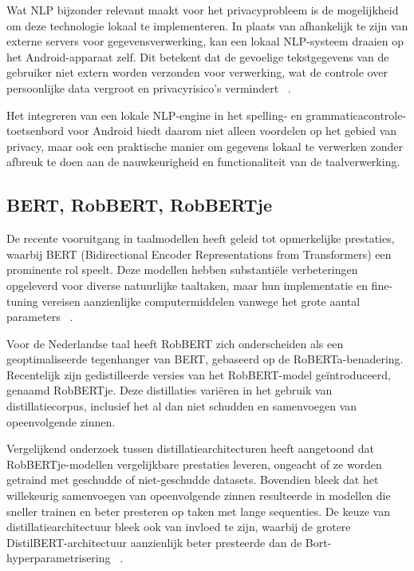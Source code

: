 Wat NLP bijzonder relevant maakt voor het privacyprobleem is de mogelijkheid om deze technologie lokaal te implementeren. In plaats van afhankelijk te zijn van externe servers voor gegevensverwerking, kan een lokaal NLP-systeem draaien op het Android-apparaat zelf. Dit betekent dat de gevoelige tekstgegevens van de gebruiker niet extern worden verzonden voor verwerking, wat de controle over persoonlijke data vergroot en pri\-va\-cy\-risico's ver\-min\-dert ~\autocite{Cistac2019}.

Het integreren van een lokale NLP-engine in het spelling- en grammaticacontrole-toetsenbord voor Android biedt daarom niet alleen voordelen op het gebied van privacy, maar ook een praktische manier om gegevens lokaal te verwerken zonder afbreuk te doen aan de nauwkeurigheid en functionaliteit van de taalverwerking.

\subsection{BERT, RobBERT, RobBERTje}
De recente vooruitgang in taalmodellen heeft geleid tot opmerkelijke prestaties, waarbij BERT (Bidirectional Encoder Representations from Tran\-s\-for\-mers) een prominente rol speelt. Deze modellen hebben substantiële verbeteringen opgeleverd voor diverse natuurlijke taaltaken, maar hun implementatie en fine-tuning vereisen aanzienlijke computermiddelen vanwege het grote aantal parameters ~\autocite{Delobelle2020}.

Voor de Nederlandse taal heeft RobBERT zich onderscheiden als een geoptimaliseerde tegenhanger van BERT, gebaseerd op de RoBERTa-be\-na\-de\-ring. Recentelijk zijn gedistilleerde versies van het RobBERT-model geïntroduceerd, ge\-naa\-md RobBERTje. Deze distillaties variëren in het gebruik van distillatiecorpus, inclusief het al dan niet schudden en samenvoegen van opeenvolgende zinnen. ~\autocite{Delobelle2021}

Vergelijkend onderzoek tussen distillatiearchitecturen heeft aangetoond dat RobBERTje-mo\-del\-len vergelijkbare prestaties leveren, ongeacht of ze worden getraind met geschudde of niet-geschudde datasets. Bovendien bleek dat het willekeurig samenvoegen van opeenvolgende zinnen resulteerde in modellen die sneller trainen en beter presteren op taken met lange sequenties. De keuze van distillatiearchitectuur bleek ook van invloed te zijn, waarbij de grotere DistilBERT-arch\-i\-tec\-tuur aanzienlijk beter presteerde dan de Bort-hyperparametrisering ~\autocite{Delobelle2021}.

